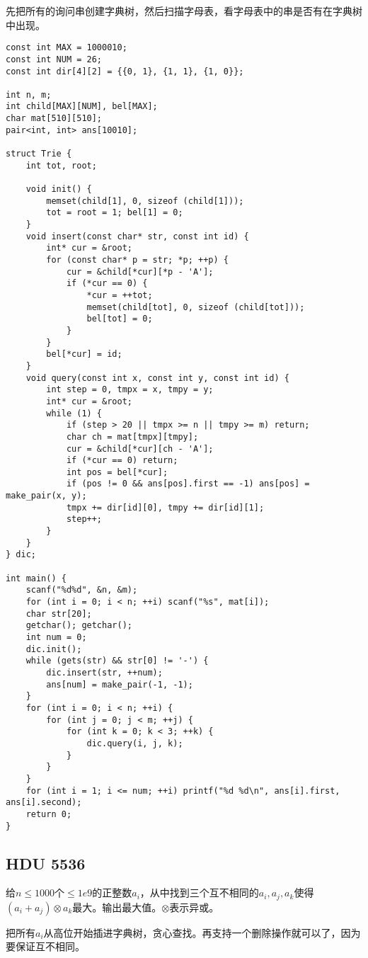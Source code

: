 先把所有的询问串创建字典树，然后扫描字母表，看字母表中的串是否有在字典树中出现。
\begin{lstlisting}
const int MAX = 1000010;
const int NUM = 26;
const int dir[4][2] = {{0, 1}, {1, 1}, {1, 0}};

int n, m;
int child[MAX][NUM], bel[MAX];
char mat[510][510];
pair<int, int> ans[10010];

struct Trie {
    int tot, root;

    void init() {
        memset(child[1], 0, sizeof (child[1]));
        tot = root = 1; bel[1] = 0;
    }
    void insert(const char* str, const int id) {
        int* cur = &root;
        for (const char* p = str; *p; ++p) {
            cur = &child[*cur][*p - 'A'];
            if (*cur == 0) {
                *cur = ++tot;
                memset(child[tot], 0, sizeof (child[tot]));
                bel[tot] = 0;
            }
        }
        bel[*cur] = id;
    }
    void query(const int x, const int y, const int id) {
        int step = 0, tmpx = x, tmpy = y;
        int* cur = &root;
        while (1) {
            if (step > 20 || tmpx >= n || tmpy >= m) return;
            char ch = mat[tmpx][tmpy];
            cur = &child[*cur][ch - 'A'];
            if (*cur == 0) return;
            int pos = bel[*cur];
            if (pos != 0 && ans[pos].first == -1) ans[pos] = make_pair(x, y);
            tmpx += dir[id][0], tmpy += dir[id][1];
            step++;
        }
    }
} dic;

int main() {
    scanf("%d%d", &n, &m);
    for (int i = 0; i < n; ++i) scanf("%s", mat[i]);
    char str[20];
    getchar(); getchar();
    int num = 0;
    dic.init();
    while (gets(str) && str[0] != '-') {
        dic.insert(str, ++num);
        ans[num] = make_pair(-1, -1);
    }
    for (int i = 0; i < n; ++i) {
        for (int j = 0; j < m; ++j) {
            for (int k = 0; k < 3; ++k) {
                dic.query(i, j, k);
            }
        }
    }
    for (int i = 1; i <= num; ++i) printf("%d %d\n", ans[i].first, ans[i].second);
    return 0;
}
\end{lstlisting}

\subsection{HDU 5536}

给$n\leq 1000$个$\leq 1e9$的正整数$a_i$，从中找到三个互不相同的$a_i,a_j,a_k$使得$(a_i+a_j)\otimes a_k$最大。输出最大值。$\otimes$表示异或。

把所有$a_i$从高位开始插进字典树，贪心查找。再支持一个删除操作就可以了，因为要保证互不相同。

